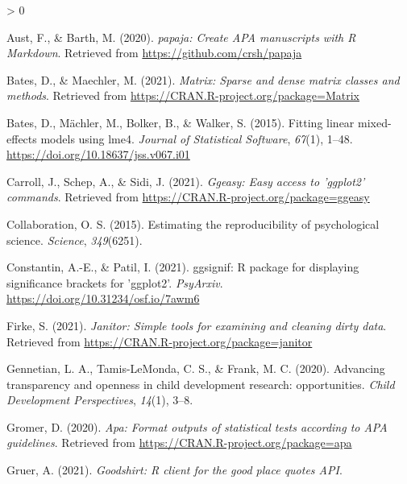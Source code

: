\documentclass[
  english,
  man]{apa6}
\newlength{\cslhangindent}
\newenvironment{CSLReferences}[2] %
 {%
  \setlength{\parindent}{0pt}
  \ifodd #1 \everypar{\setlength{\hangindent}{\cslhangindent}}\ignorespaces\fi
  \ifnum #2 > 0
  \setlength{\parskip}{#2\baselineskip}
  \fi
 }%
 {}
\begin{document}
\begingroup
\setlength{\parindent}{-0.5in}
\setlength{\leftskip}{0.5in}

\hypertarget{refs}{}
\begin{CSLReferences}{1}{0}
\leavevmode\hypertarget{ref-R-papaja}{}%
Aust, F., \& Barth, M. (2020). \emph{{papaja}: {Create} {APA} manuscripts with {R Markdown}}. Retrieved from \url{https://github.com/crsh/papaja}

\leavevmode\hypertarget{ref-R-Matrix}{}%
Bates, D., \& Maechler, M. (2021). \emph{Matrix: Sparse and dense matrix classes and methods}. Retrieved from \url{https://CRAN.R-project.org/package=Matrix}

\leavevmode\hypertarget{ref-R-lme4}{}%
Bates, D., Mächler, M., Bolker, B., \& Walker, S. (2015). Fitting linear mixed-effects models using {lme4}. \emph{Journal of Statistical Software}, \emph{67}(1), 1--48. \url{https://doi.org/10.18637/jss.v067.i01}

\leavevmode\hypertarget{ref-R-ggeasy}{}%
Carroll, J., Schep, A., \& Sidi, J. (2021). \emph{Ggeasy: Easy access to 'ggplot2' commands}. Retrieved from \url{https://CRAN.R-project.org/package=ggeasy}

\leavevmode\hypertarget{ref-open2015estimating}{}%
Collaboration, O. S. (2015). Estimating the reproducibility of psychological science. \emph{Science}, \emph{349}(6251).

\leavevmode\hypertarget{ref-R-ggsignif}{}%
Constantin, A.-E., \& Patil, I. (2021). {ggsignif}: R package for displaying significance brackets for {'ggplot2'}. \emph{PsyArxiv}. \url{https://doi.org/10.31234/osf.io/7awm6}

\leavevmode\hypertarget{ref-R-janitor}{}%
Firke, S. (2021). \emph{Janitor: Simple tools for examining and cleaning dirty data}. Retrieved from \url{https://CRAN.R-project.org/package=janitor}

\leavevmode\hypertarget{ref-gennetian2020advancing}{}%
Gennetian, L. A., Tamis-LeMonda, C. S., \& Frank, M. C. (2020). Advancing transparency and openness in child development research: opportunities. \emph{Child Development Perspectives}, \emph{14}(1), 3--8.

\leavevmode\hypertarget{ref-R-apa}{}%
Gromer, D. (2020). \emph{Apa: Format outputs of statistical tests according to APA guidelines}. Retrieved from \url{https://CRAN.R-project.org/package=apa}

\leavevmode\hypertarget{ref-R-goodshirt}{}%
Gruer, A. (2021). \emph{Goodshirt: R client for the good place quotes API}.


\end{CSLReferences}
\end{document}
